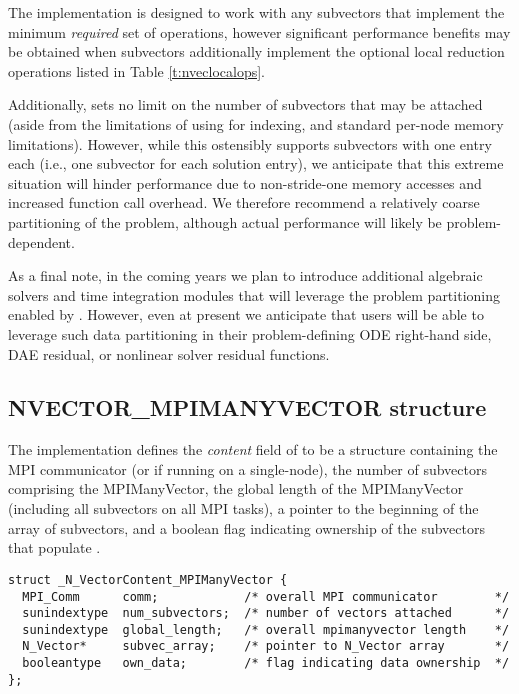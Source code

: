 The {\nvecmpimanyvector} implementation is designed to work with any
{\nvector} subvectors that implement the minimum \emph{required} set
of operations, however significant performance benefits may be
obtained when subvectors additionally implement the optional local
reduction operations listed in Table \ref{t:nveclocalops}.

Additionally, {\nvecmpimanyvector} sets no limit on the number of
subvectors that may be attached (aside from the limitations of using
 for indexing, and standard per-node memory
limitations).  However, while this ostensibly supports subvectors
with one entry each (i.e., one subvector for each solution entry), we
anticipate that this extreme situation will hinder performance due to
non-stride-one memory accesses and increased function call overhead.
We therefore recommend a relatively coarse partitioning of the
problem, although actual performance will likely be
problem-dependent.

As a final note, in the coming years we plan to introduce additional
algebraic solvers and time integration modules that will leverage the
problem partitioning enabled by {\nvecmpimanyvector}.  However, even at
present we anticipate that users will be able to leverage such data
partitioning in their problem-defining ODE right-hand side, DAE
residual, or nonlinear solver residual functions.


\subsection{NVECTOR\_MPIMANYVECTOR structure}
\label{ss:nvec_mpimanyvector_structure}


The {\nvecmpimanyvector} implementation defines the {\em content} field
of  to be a structure containing the MPI communicator
(or  if running on a single-node), the number of
subvectors comprising the MPIManyVector, the global length of the
MPIManyVector (including all subvectors on all MPI tasks), a pointer to
the beginning of the array of subvectors, and a boolean flag
 indicating ownership of the subvectors that populate
.
\begin{verbatim} 
struct _N_VectorContent_MPIManyVector {
  MPI_Comm      comm;            /* overall MPI communicator        */
  sunindextype  num_subvectors;  /* number of vectors attached      */
  sunindextype  global_length;   /* overall mpimanyvector length    */
  N_Vector*     subvec_array;    /* pointer to N_Vector array       */
  booleantype   own_data;        /* flag indicating data ownership  */
};
\end{verbatim}

